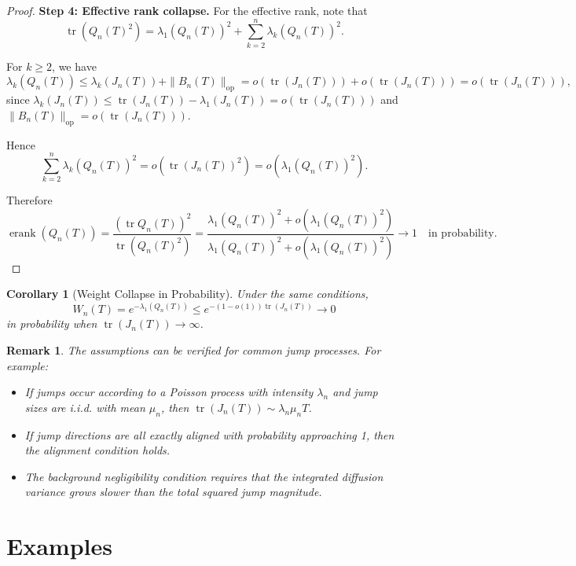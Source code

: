 \documentclass{article}
\newtheorem{corollary}{Corollary}
\newtheorem{remark}{Remark}
\begin{document}
\begin{proof}
\textbf{Step 4: Effective rank collapse.}
For the effective rank, note that
\[
\operatorname{tr}(Q_n(T)^2) = \lambda_1(Q_n(T))^2 + \sum_{k=2}^n \lambda_k(Q_n(T))^2.
\]

For \(k \ge 2\), we have
\[
\lambda_k(Q_n(T)) \le \lambda_k(J_n(T)) + \|B_n(T)\|_{\mathrm{op}} = o(\operatorname{tr}(J_n(T))) + o(\operatorname{tr}(J_n(T))) = o(\operatorname{tr}(J_n(T))),
\]
since \(\lambda_k(J_n(T)) \le \operatorname{tr}(J_n(T)) - \lambda_1(J_n(T)) = o(\operatorname{tr}(J_n(T)))\) and \(\|B_n(T)\|_{\mathrm{op}} = o(\operatorname{tr}(J_n(T)))\).

Hence
\[
\sum_{k=2}^n \lambda_k(Q_n(T))^2 = o(\operatorname{tr}(J_n(T))^2) = o(\lambda_1(Q_n(T))^2).
\]

Therefore
\[
\operatorname{erank}(Q_n(T)) = \frac{(\operatorname{tr} Q_n(T))^2}{\operatorname{tr}(Q_n(T)^2)} = \frac{\lambda_1(Q_n(T))^2 + o(\lambda_1(Q_n(T))^2)}{\lambda_1(Q_n(T))^2 + o(\lambda_1(Q_n(T))^2)} \to 1 \quad \text{in probability}.
\]

\end{proof}

\begin{corollary}[Weight Collapse in Probability]
Under the same conditions,
\[
W_n(T) = e^{-\lambda_1(Q_n(T))} \le e^{-(1-o(1)) \operatorname{tr}(J_n(T))} \to 0
\]
in probability when \(\operatorname{tr}(J_n(T)) \to \infty\).
\end{corollary}

\begin{remark}
The assumptions can be verified for common jump processes. For example:
\begin{itemize}
\item If jumps occur according to a Poisson process with intensity \(\lambda_n\) and jump sizes are i.i.d. with mean \(\mu_n\), then \(\operatorname{tr}(J_n(T)) \sim \lambda_n \mu_n T\).
\item If jump directions are all exactly aligned with probability approaching 1, then the alignment condition holds.
\item The background negligibility condition requires that the integrated diffusion variance grows slower than the total squared jump magnitude.
\end{itemize}
\end{remark}

\section{Examples}
\end{document}
